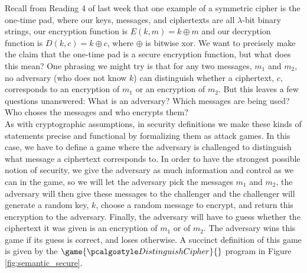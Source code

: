 \documentclass[12pt]{article}
\theoremstyle{definition}
\theoremstyle{remark}
\theoremstyle{definition}
\begin{document}
Recall from Reading 4 of last week that one example of a symmetric cipher is the one-time pad, where our keys, messages, and ciphertexts are all $\lambda$-bit binary strings, our encryption function is $E(k, m) = k\oplus m$ and our decryption function is $D(k, c) = k\oplus c$, where $\oplus$ is bitwise xor. We want to precisely make the claim that the one-time pad is a secure encryption function, but what does this mean? One phrasing we might try is that for any two messages, $m_1$ and $m_2$, no adversary (who does not know $k$) can distinguish whether a ciphertext, $c$, corresponds to an encryption of $m_1$ or an encryption of $m_2$. But this leaves a few questions unanswered: What is an adversary? Which messages are being used? Who choses the messages and who encrypts them?\\

As with cryptographic assumptions, in security definitions we make these kinds of statements precise and functional by formalizing them as attack games. In this case, we have to define a game where the adversary is challenged to distinguish what message a ciphertext corresponds to. In order to have the strongest possible notion of security, we give the adversary as much information and control as we can in the game, so we will let the adversary pick the messages $m_1$ and $m_2$, the adversary will then give these messages to the challenger and the challenger will generate a random key, $k$, choose a random message to encrypt, and return this encryption to the adversary. Finally, the adversary will have to guess whether the ciphertext it was given is an encryption of $m_1$ or of $m_2$. The adversary wins this game if its guess is correct, and loses otherwise. A succinct definition of this game is given by the $\game{\algo{DistinguishCipher}}{}$ program in Figure \ref{fig:semantic_secure}.
\end{document}

